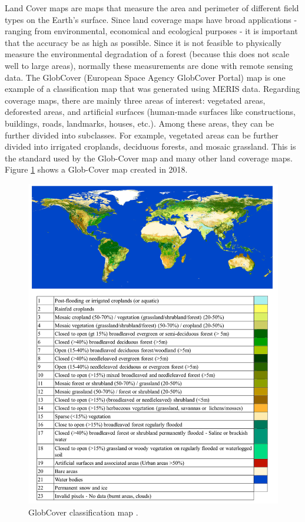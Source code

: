 Land Cover maps are maps that measure the area and perimeter of different field types
on the Earth's surface. Since land coverage maps have broad applications - ranging from
environmental, economical and ecological purposes - it is important that the accuracy
be as high as possible. Since it is not feasible to physically measure the environmental
degradation of a forest (because this does not scale well to large areas), normally these
measurements are done with remote sensing data. The GlobCover \cite{globcover, glob} (European Space Agency GlobCover Portal) map is one example
of a classification map that was generated using MERIS data. Regarding coverage maps, there are mainly three areas of interest: vegetated areas, deforested areas, and artificial surfaces (human-made surfaces like constructions, buildings, roads, landmarks, houses, etc.). Among these areas, they can be further divided into subclasses. For example, vegetated areas can be further divided into irrigated croplands, deciduous forests, and mosaic grassland. This is the standard used by the Glob-Cover map and many other land coverage maps. Figure \ref{fig:glob_cover_map} shows a Glob-Cover map created in 2018. 


\begin{figure}[H]
    \centering
    \includegraphics[width=\linewidth]{Cap2/glob_cover.png}
    \caption{GlobCover classification map \cite{Paolathesis}.}
    \label{fig:glob_cover_map}
\end{figure}

